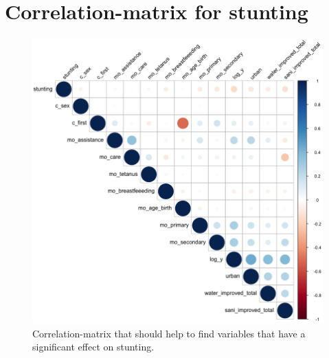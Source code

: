 \documentclass[a4paper, 11pt]{article} %
\begin{document}
\section{Correlation-matrix for stunting} \label{sec:appendixc}
\begin{figure}[h!]
    \centering
    \includegraphics[scale=0.45]{figures/corrmatrix_stunting_4} 
    \caption{Correlation-matrix that should help to find variables that have a significant effect on stunting.}
    \label{fig:corrmatrix_stunting}
\end{figure}


\newpage
\end{document}
